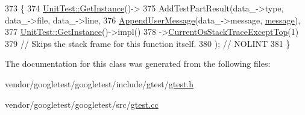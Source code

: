 \begin{DoxyCode}
373                                                          \{
374   \hyperlink{classtesting_1_1UnitTest_a24192400b70b3b946746954e9574fb8e}{UnitTest::GetInstance}()->
375     AddTestPartResult(data\_->type, data\_->file, data\_->line,
376                       \hyperlink{namespacetesting_1_1internal_ae475a090bca903bb222dd389eb189166}{AppendUserMessage}(data\_->message, \hyperlink{namespacegtest__output__test_ac696d0798ad7d08cb2e61070824750e2}{message}),
377                       \hyperlink{classtesting_1_1UnitTest_a24192400b70b3b946746954e9574fb8e}{UnitTest::GetInstance}()->impl()
378                       ->\hyperlink{classtesting_1_1internal_1_1UnitTestImpl_a61c0a51ac4e57d9f884f646ca6dd2210}{CurrentOsStackTraceExceptTop}(1)
379                       \textcolor{comment}{// Skips the stack frame for this function itself.}
380                       );  \textcolor{comment}{// NOLINT}
381 \}
\end{DoxyCode}


The documentation for this class was generated from the following files\+:\begin{DoxyCompactItemize}
\item 
vendor/googletest/googletest/include/gtest/\hyperlink{gtest_8h}{gtest.\+h}\item 
vendor/googletest/googletest/src/\hyperlink{gtest_8cc}{gtest.\+cc}\end{DoxyCompactItemize}
